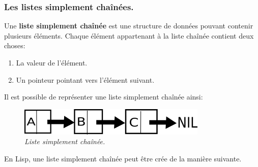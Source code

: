 \documentclass[a4paper, 12pt]{article}
\numberwithin{equation}{subsection}
\begin{document}
\subsubsection{Les listes simplement chaînées.}
Une {\bf liste simplement chaînée} est une structure de données pouvant contenir plusieurs éléments. Chaque élément appartenant à la liste chaînée contient deux choses:
\begin{enumerate}
  \item La valeur de l'élément.
  \item Un pointeur pointant vers l'élément suivant. \\[0.2cm]
\end{enumerate}

Il est possible de représenter une liste simplement chaînée ainsi: \\
\begin{figure}[H]
  \centering
  \includegraphics[width=9.0cm]{imgs/linked_list.png}
  \caption{{\em Liste simplement chaînée.}}
\end{figure}
En Lisp, une liste simplement chaînée peut être crée de la manière suivante. \\
\end{document}
